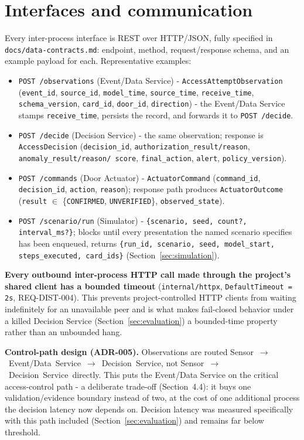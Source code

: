 \documentclass[11pt]{article}
\begin{document}
\section{Interfaces and communication}
\label{sec:interfaces}

Every inter-process interface is REST over HTTP/JSON, fully specified in
\texttt{docs/data-contracts.md}: endpoint, method, request/response
schema, and an example payload for each. Representative examples:

\begin{itemize}
\item \texttt{POST /observations} (Event/Data Service) -
\texttt{AccessAttemptObservation} (\texttt{event\_id}, \texttt{source\_id},
\texttt{model\_time}, \texttt{source\_time}, \texttt{receive\_time},
\texttt{schema\_version}, \texttt{card\_id}, \texttt{door\_id},
\texttt{direction}) - the Event/Data Service stamps
\texttt{receive\_time}, persists the record, and forwards it to
\texttt{POST /decide}.
\item \texttt{POST /decide} (Decision Service) - the same observation;
response is \texttt{AccessDecision} (\texttt{decision\_id},
\texttt{authorization\_result/reason}, \texttt{anomaly\_result/reason/
score}, \texttt{final\_action}, \texttt{alert}, \texttt{policy\_version}).
\item \texttt{POST /commands} (Door Actuator) - \texttt{ActuatorCommand}
(\texttt{command\_id}, \texttt{decision\_id}, \texttt{action},
\texttt{reason}); response path produces \texttt{ActuatorOutcome}
(\texttt{result} \(\in\) \{\texttt{CONFIRMED}, \texttt{UNVERIFIED}\},
\texttt{observed\_state}).
\item \texttt{POST /scenario/run} (Simulator) - \texttt{\{scenario, seed,
count?, interval\_ms?\}}; blocks until every presentation the named
scenario specifies has been enqueued, returns
\texttt{\{run\_id, scenario, seed, model\_start, steps\_executed,
card\_ids\}} (Section~\ref{sec:simulation}).
\end{itemize}

\textbf{Every outbound inter-process HTTP call made through the project's
shared client has a bounded timeout}
(\texttt{internal/httpx}, \texttt{DefaultTimeout = 2s}, REQ-DIST-004).
This prevents project-controlled HTTP clients from waiting indefinitely
for an unavailable peer and is what makes fail-closed behavior under a
killed Decision Service (Section~\ref{sec:evaluation}) a bounded-time
property rather than an unbounded hang.

\textbf{Control-path design (ADR-005).} Observations are routed
Sensor~\(\rightarrow\)~Event/Data~Service~\(\rightarrow\)~Decision~Service,
not Sensor~\(\rightarrow\)~Decision~Service~directly. This puts the
Event/Data Service on the critical access-control path - a deliberate
trade-off (Section~4.4): it buys one validation/evidence boundary instead
of two, at the cost of one additional process the decision latency now
depends on. Decision latency was measured specifically with this path
included (Section~\ref{sec:evaluation}) and remains far below threshold.
\end{document}
